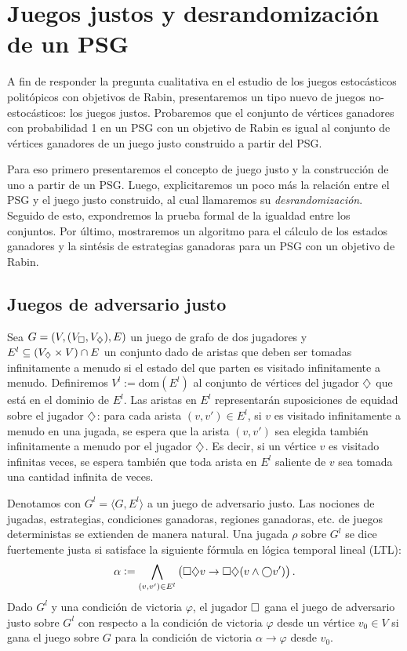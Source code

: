 \section{Juegos justos y desrandomización de un PSG}
\label{sec:prueba}

A fin de responder la pregunta cualitativa en el estudio de los juegos
estocásticos politópicos con objetivos de Rabin, presentaremos un tipo nuevo de
juegos no-estocásticos: los juegos justos. Probaremos que el conjunto de
vértices ganadores con probabilidad 1 en un PSG con un objetivo de Rabin es
igual al conjunto de vértices ganadores de un juego justo construido a partir
del PSG.

Para eso primero presentaremos el concepto de juego justo y la construcción de
uno a partir de un PSG. Luego, explicitaremos un poco más la relación entre el
PSG y el juego justo construido, al cual llamaremos su
\textit{desrandomización}. Seguido de esto, expondremos la prueba formal de la
igualdad entre los conjuntos. Por último, mostraremos un algoritmo para el
cálculo de los estados ganadores y la sintésis de estrategias ganadoras para un
PSG con un objetivo de Rabin. %

\subsection*{Juegos de adversario justo}

Sea $G = (V, (V_\square, V_\diamondsuit), E)$ un juego de grafo de dos jugadores y
$E^{l} \subseteq (V_\diamondsuit \times V) \cap E$ un conjunto dado de aristas que
deben ser tomadas infinitamente a menudo si el estado del que parten es
visitado infinitamente a menudo. Definiremos $V^{l} := \mathrm{dom}(E^{l})$ al
conjunto de vértices del jugador $\diamondsuit$ que está en el dominio de $E^{l}$. Las
aristas en $E^{l}$ representarán suposiciones de equidad sobre el jugador
$\diamondsuit$: para cada arista $(v, v') \in E^{l}$, si $v$ es visitado infinitamente
a menudo en una jugada, se espera que la arista $(v, v')$ sea elegida también
infinitamente a menudo por el jugador $\diamondsuit$. Es decir, si un vértice $v$ es
visitado infinitas veces, se espera también que toda arista en $E^l$ saliente
de $v$ sea tomada una cantidad infinita de veces.

Denotamos con $G^{l} = \langle G, E^{l} \rangle$ a un juego de adversario
justo. Las nociones de jugadas, estrategias, condiciones ganadoras, regiones
ganadoras, etc. de juegos deterministas se extienden de manera natural. Una
jugada $\rho$ sobre $G^{l}$ se dice fuertemente justa si satisface la siguiente
fórmula en lógica temporal lineal (LTL):
\[
	\alpha := \bigwedge_{(v, v') \in E^{l}} \left( \square \diamondsuit v \rightarrow \square \diamondsuit (v \wedge \bigcirc v') \right).
\]
Dado $G^{l}$ y una condición de victoria $\varphi$, el jugador $\square$ gana el
juego de adversario justo sobre $G^{l}$ con respecto a la condición de victoria
$\varphi$ desde un vértice $v_0 \in V$ si gana el juego sobre $G$ para la
condición de victoria $\alpha \rightarrow \varphi$ desde $v_0$.

